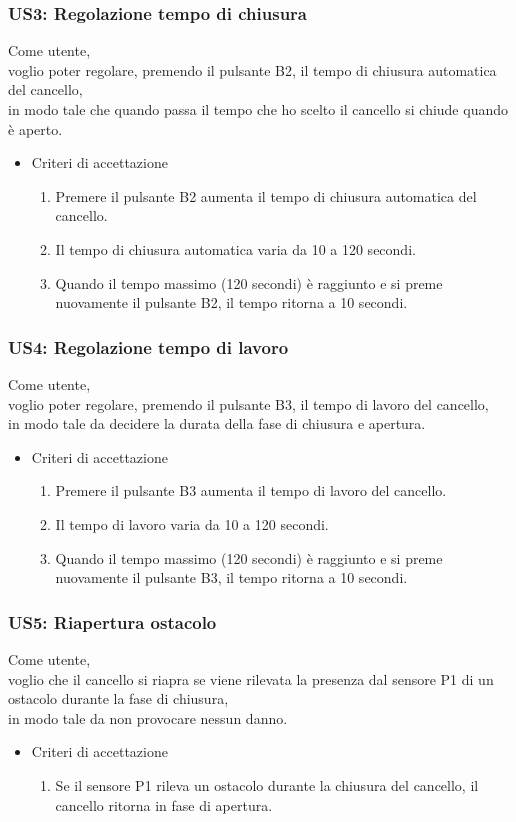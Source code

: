 \documentclass[12pt]{article}
\begin{document}
\subsubsection{US3: Regolazione tempo di chiusura}
Come utente, \\
voglio poter regolare, premendo il pulsante B2, il tempo di chiusura automatica del cancello,\\
in modo tale che quando passa il tempo che ho scelto il cancello si chiude quando è aperto.
\begin{itemize}
    \item Criteri di accettazione
    \begin{enumerate}
        \item Premere il pulsante B2 aumenta il tempo di chiusura automatica del cancello.
        \item Il tempo di chiusura automatica varia da 10 a 120 secondi.
        \item Quando il tempo massimo (120 secondi) è raggiunto e si preme nuovamente il pulsante B2, il tempo ritorna a 10 secondi.
    \end{enumerate}
\end{itemize}
\subsubsection{US4: Regolazione tempo di lavoro}
Come utente, \\
voglio poter regolare, premendo il pulsante B3, il tempo di lavoro del cancello,\\
in modo tale da decidere la durata della fase di chiusura e apertura.
\begin{itemize}
    \item Criteri di accettazione
    \begin{enumerate}
        \item Premere il pulsante B3 aumenta il tempo di lavoro del cancello.
        \item Il tempo di lavoro varia da 10 a 120 secondi.
        \item Quando il tempo massimo (120 secondi) è raggiunto e si preme nuovamente il pulsante B3, il tempo ritorna a 10 secondi.
    \end{enumerate}
\end{itemize}
\subsubsection{US5: Riapertura ostacolo}
Come utente, \\
voglio che il cancello si riapra se viene rilevata la presenza dal sensore P1 di un ostacolo durante la fase di chiusura,\\
in modo tale da non provocare nessun danno.
\begin{itemize}
    \item Criteri di accettazione
    \begin{enumerate}
        \item Se il sensore P1 rileva un ostacolo durante la chiusura del cancello, il cancello ritorna in fase di apertura.
    \end{enumerate}
\end{itemize}
\end{document}
